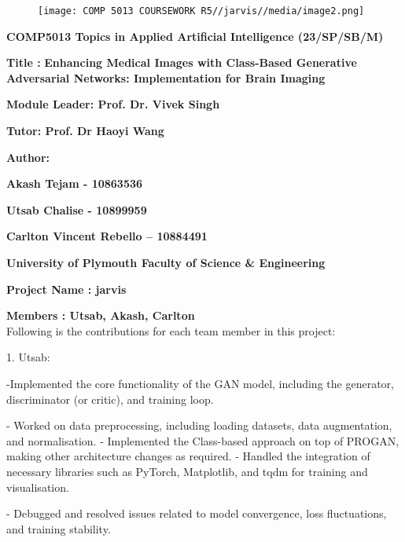 \documentclass[
]{article}
\author{}
\date{}
\begin{document}
\begin{figure}
    \centering
    \texttt{[image: COMP 5013 COURSEWORK R5//jarvis//media/image2.png]}
\end{figure}

 \begin{center}
\textbf{COMP5013 Topics in Applied Artificial Intelligence (23/SP/SB/M)}

\hspace{1cm}


\textbf{Title :}
\textbf{Enhancing Medical Images with Class-Based Generative Adversarial
Networks: Implementation for Brain Imaging}

\hspace{1cm}


\textbf{Module Leader: Prof. Dr. Vivek Singh}


\textbf{Tutor: Prof. Dr Haoyi Wang}

\hspace{1cm}


\textbf{Author:}


\textbf{Akash Tejam - 10863536}


\textbf{Utsab Chalise - 10899959}


\textbf{Carlton Vincent Rebello -- 10884491}

\hspace{10cm}


\textbf{University of Plymouth Faculty of Science \& Engineering}
\end{center}

\pagebreak


\textbf{Project Name : jarvis}

\textbf{Members : Utsab, Akash, Carlton}\\
Following is the contributions for each team member in this project:

1. Utsab:

-Implemented the core functionality of the GAN model, including the
generator, discriminator (or critic), and training loop.

- Worked on data preprocessing, including loading datasets, data
augmentation, and normalisation.
- Implemented the Class-based approach on top of PROGAN, making other architecture changes as required.
- Handled the integration of necessary libraries such as PyTorch,
Matplotlib, and tqdm for training and visualisation.

- Debugged and resolved issues related to model convergence, loss
fluctuations, and training stability.
\end{document}
